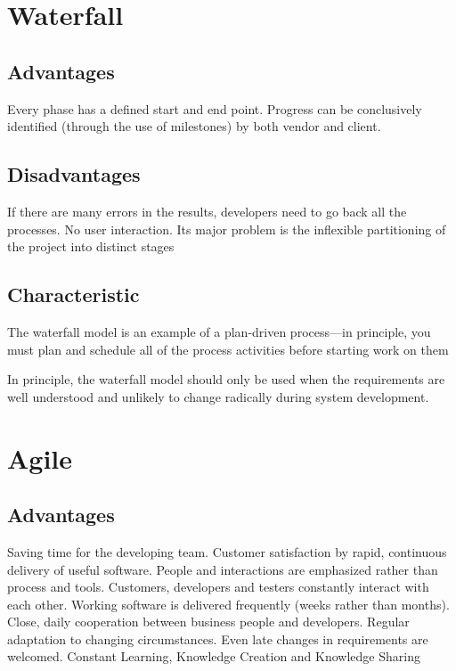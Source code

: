 \renewcommand{\headrulewidth}{0.1pt}
\renewcommand{\footrulewidth}{0.1pt}

\section*{Waterfall}

\subsection*{Advantages}
Every phase has a defined start and end point.
Progress can be conclusively identified (through the use of milestones) by both vendor and client.

\subsection*{Disadvantages}
If there are many errors in the results, developers need to go back all the processes. 
No user interaction.
Its major problem is the inflexible partitioning
of the project into distinct stages

\subsection*{Characteristic}
The waterfall model is an example of
a plan-driven process—in principle, you must plan and schedule all of the process
activities before starting work on them

In principle, the waterfall model should only be used when the requirements are
well understood and unlikely to change radically during system development.

\section*{Agile}
\subsection*{Advantages}
Saving time for the developing team.
Customer satisfaction by rapid, continuous delivery of useful software.
People and interactions are emphasized rather than process and tools. Customers, developers and testers constantly interact with each other.
Working software is delivered frequently (weeks rather than months).
Close, daily cooperation between business people and developers.
Regular adaptation to changing circumstances.
Even late changes in requirements are welcomed.
Constant Learning, Knowledge Creation and Knowledge Sharing


